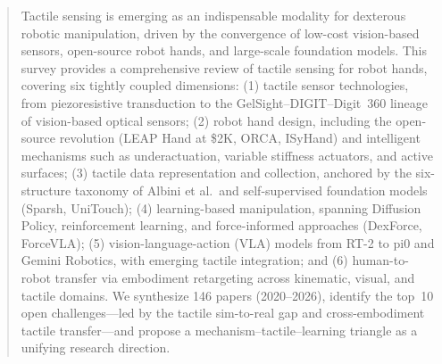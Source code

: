 \begin{abstract}
Tactile sensing is emerging as an indispensable modality for dexterous robotic manipulation, driven by the convergence of low-cost vision-based sensors, open-source robot hands, and large-scale foundation models. This survey provides a comprehensive review of tactile sensing for robot hands, covering six tightly coupled dimensions: (1) tactile sensor technologies, from piezoresistive transduction to the GelSight--DIGIT--Digit~360 lineage of vision-based optical sensors; (2) robot hand design, including the open-source revolution (LEAP Hand at \$2K, ORCA, ISyHand) and intelligent mechanisms such as underactuation, variable stiffness actuators, and active surfaces; (3) tactile data representation and collection, anchored by the six-structure taxonomy of Albini et al.\ and self-supervised foundation models (Sparsh, UniTouch); (4) learning-based manipulation, spanning Diffusion Policy, reinforcement learning, and force-informed approaches (DexForce, ForceVLA); (5) vision-language-action (VLA) models from RT-2 to pi0 and Gemini Robotics, with emerging tactile integration; and (6) human-to-robot transfer via embodiment retargeting across kinematic, visual, and tactile domains. We synthesize 146 papers (2020--2026), identify the top~10 open challenges---led by the tactile sim-to-real gap and cross-embodiment tactile transfer---and propose a mechanism--tactile--learning triangle as a unifying research direction.
\end{abstract}
